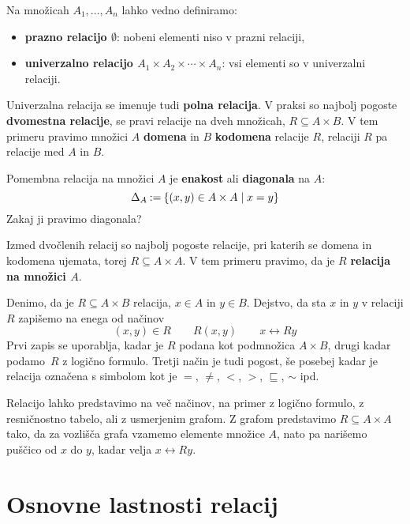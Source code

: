 Na množicah $A_1, \ldots, A_n$ lahko vedno definiramo:
%
\begin{itemize}
\item \textbf{prazno relacijo $\emptyset$}: nobeni elementi niso v prazni relaciji,
\item \textbf{univerzalno relacijo $A_1 \times A_2 \times \cdots \times A_n$}: vsi elementi so v univerzalni relaciji.
\end{itemize}
%
Univerzalna relacija se imenuje tudi \textbf{polna relacija}.
%
V praksi so najbolj pogoste \textbf{dvomestna relacije}, se pravi relacije na dveh
množicah, $R \subseteq A \times B$.
V tem primeru pravimo množici $A$ \textbf{domena} in $B$ \textbf{kodomena} relacije $R$, relaciji $R$ pa relacije med $A$ in $B$.

Pomembna relacija na množici $A$ je \textbf{enakost} ali \textbf{diagonala} na $A$:
%
\begin{equation*}
    \diag[A] \defeq \set{ (x, y) \in A \times A \such x = y }
\end{equation*}
%
Zakaj ji pravimo diagonala?

Izmed dvočlenih relacij so najbolj pogoste relacije, pri katerih se domena in
kodomena ujemata, torej $R \subseteq A \times A$. V tem primeru pravimo, da je $R$ \textbf{relacija na množici $A$}.

Denimo, da je $R \subseteq A \times B$ relacija, $x \in A$ in $y \in B$. Dejstvo, da sta $x$ in $y$ v relaciji $R$ zapišemo na enega od načinov
%
\begin{equation*}
  (x, y) \in R
  \qquad
  R(x, y)
  \qquad
  x \rel{R} y
\end{equation*}
%
Prvi zapis se uporablja, kadar je $R$ podana kot podmnožica $A \times B$, drugi kadar
podamo~$R$ z logično formulo. Tretji način je tudi pogost, še posebej kadar je
relacija označena s simbolom kot je $=$, $\neq$, $<$, $>$, $\sqsubseteq$, $\sim$ ipd.

Relacijo lahko predstavimo na več načinov, na primer z logično formulo, z resničnostno tabelo, ali z usmerjenim grafom.
%
Z grafom predstavimo $R \subseteq A \times A$ tako, da za vozlišča grafa vzamemo
elemente množice $A$, nato pa narišemo puščico od $x$ do $y$, kadar velja $x \rel{R} y$.


\section{Osnovne lastnosti relacij}

